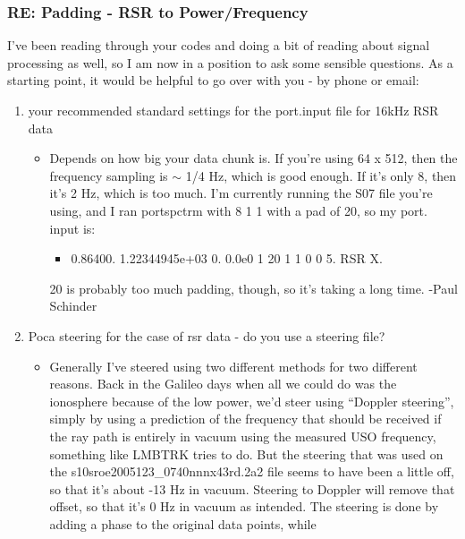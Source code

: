 \documentclass[crop=false,class=article,oneside]{standalone}
\begin{document}
\subsubsection{\footnotesize RE: Padding - RSR to Power/Frequency}
I've been reading through your codes and doing a bit of reading about signal processing as well, so I am now in a position to ask some sensible questions. As a starting point, it would be helpful to go over with you - by phone or email:
\begin{enumerate}
    \item your recommended standard settings for the port.input file for 16kHz RSR data
    \begin{itemize}
        \item Depends on how big your data chunk is. If you’re using
              64 x 512, then the frequency sampling is $\sim$ 1/4 Hz,
              which is good enough.  If it’s only 8, then it’s 2 Hz,
              which is too much. I’m currently running the S07 file
              you’re using, and I ran portspctrm with 8 1 1 with a
              pad of 20, so my port. input is:
            \begin{itemize}
                \item 0.86400. 1.22344945e+03 0. 0.0e0 1 20 1 1 0 0 5. RSR X.
            \end{itemize}
        20 is probably too much padding, though, so it’s taking a long time. -Paul Schinder
    \end{itemize}
    \item Poca steering for the case of rsr data - do you use a
          steering file?
    \begin{itemize}
        \item Generally I've steered using two different methods for
              two different reasons.  Back in the Galileo days when
              all we could do was the ionosphere because of the low
              power, we'd steer using ``Doppler steering'', simply
              by using a prediction of the frequency that should be
              received if the ray path is entirely in vacuum using
              the measured USO frequency, something like LMBTRK tries
              to do.  But the steering that was used on the
              s10sroe2005123\_0740nnnx43rd.2a2 file seems to have
              been a little off, so that it's about -13 Hz in vacuum.
              Steering to Doppler will remove that offset, so that
              it’s 0 Hz in vacuum as intended.  The steering is done
              by adding a phase to the original data points, while

\end{itemize}
\end{enumerate}
\end{document}
